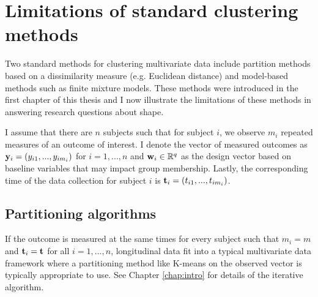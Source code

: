 \section{Limitations of standard clustering methods}
Two standard methods for clustering multivariate data include partition methods based on a dissimilarity measure (e.g. Euclidean distance) and model-based methods such as finite mixture models. These methods were introduced in the first chapter of this thesis and I now illustrate the limitations of these methods in answering research questions about shape. 

I assume that there are $n$ subjects such that for subject $i$, we observe $m_{i}$ repeated measures of an outcome of interest. I denote the vector of measured outcomes as $\mathbf y_{i}=(y_{i1},...,y_{im_{i}})$ for $i=1,...,n$ and $\mathbf w_{i}\in \mathbb{R}^{q}$ as the design vector based on baseline variables that may impact group membership. Lastly, the corresponding time of the data collection for subject $i$ is $\mathbf t_{i}=(t_{i1},...,t_{im_{i}})$. 

\subsection{Partitioning algorithms}
If the outcome is measured at the same times for every subject such that $m_{i}=m$ and $\mathbf t_{i}=\mathbf t$ for all $i=1,...,n$, longitudinal data fit into a typical multivariate data framework where a partitioning method like K-means \cite{macqueen1967, hartigan1979} on the observed vector is typically appropriate to use. See Chapter \ref{chap:intro} for details of the iterative algorithm.

